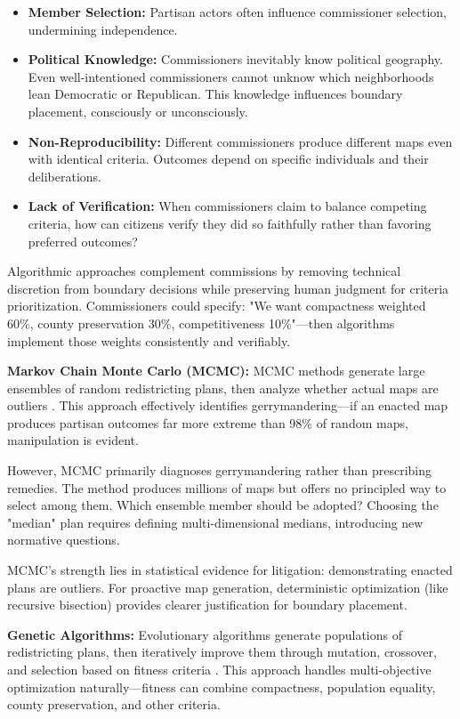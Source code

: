\begin{itemize}
    \item \textbf{Member Selection:} Partisan actors often influence commissioner selection, undermining independence.
    \item \textbf{Political Knowledge:} Commissioners inevitably know political geography. Even well-intentioned commissioners cannot unknow which neighborhoods lean Democratic or Republican. This knowledge influences boundary placement, consciously or unconsciously.
    \item \textbf{Non-Reproducibility:} Different commissioners produce different maps even with identical criteria. Outcomes depend on specific individuals and their deliberations.
    \item \textbf{Lack of Verification:} When commissioners claim to balance competing criteria, how can citizens verify they did so faithfully rather than favoring preferred outcomes?
\end{itemize}

Algorithmic approaches complement commissions by removing technical discretion from boundary decisions while preserving human judgment for criteria prioritization. Commissioners could specify: "We want compactness weighted 60\%, county preservation 30\%, competitiveness 10\%"—then algorithms implement those weights consistently and verifiably.

\textbf{Markov Chain Monte Carlo (MCMC):} MCMC methods generate large ensembles of random redistricting plans, then analyze whether actual maps are outliers \cite{fifield2020automated}. This approach effectively identifies gerrymandering—if an enacted map produces partisan outcomes far more extreme than 98\% of random maps, manipulation is evident.

However, MCMC primarily diagnoses gerrymandering rather than prescribing remedies. The method produces millions of maps but offers no principled way to select among them. Which ensemble member should be adopted? Choosing the "median" plan requires defining multi-dimensional medians, introducing new normative questions.

MCMC's strength lies in statistical evidence for litigation: demonstrating enacted plans are outliers. For proactive map generation, deterministic optimization (like recursive bisection) provides clearer justification for boundary placement.

\textbf{Genetic Algorithms:} Evolutionary algorithms generate populations of redistricting plans, then iteratively improve them through mutation, crossover, and selection based on fitness criteria \cite{liu2016pear}. This approach handles multi-objective optimization naturally—fitness can combine compactness, population equality, county preservation, and other criteria.


